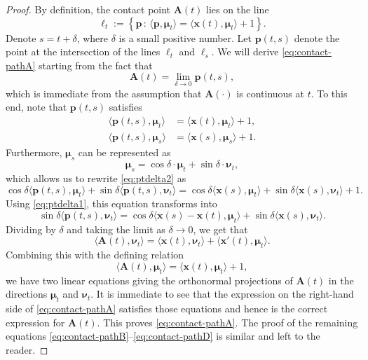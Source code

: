 \documentclass[11pt]{article}
\newcommand{\nvecone}{\boldsymbol{\mu}}
\newcommand{\nvectwo}{\boldsymbol{\nu}}
\begin{document}
\begin{proof} 
By definition, the contact point $\mathbf{A}(t)$ lies on the line
$$
\ell_t := \left\{ \mathbf{p}\,:\,
\Big\langle \mathbf{p}, \nvecone_t \Big\rangle = \Big\langle \mathbf{x}(t), \nvecone_t \Big\rangle +1
\right\}.
$$
Denote $s=t+\delta$, where $\delta$ is a small positive number.
Let $\mathbf{p}(t,s)$ denote the point at the intersection of the lines $\ell_t$ and $\ell_s$. We will derive \eqref{eq:contact-pathA} starting from the fact that
$$ \mathbf{A}(t) = \lim_{\delta\to 0} \mathbf{p}(t,s), $$
which is immediate from the assumption that $\mathbf{A}(\cdot)$ is continuous at $t$. To this end, note that $\mathbf{p}(t,s)$ satisfies
\begin{align}
\Big\langle \mathbf{p}(t,s), \nvecone_t \Big \rangle &= \Big\langle \mathbf{x}(t), \nvecone_t \Big \rangle+1, 
\label{eq:ptdelta1}
\\
\Big\langle \mathbf{p}(t,s), \nvecone_s \Big \rangle &= \Big\langle \mathbf{x}(s), \nvecone_s \Big \rangle+1.
\label{eq:ptdelta2}
\end{align}
Furthermore, $\nvecone_s$ can be represented as
$$
\nvecone_s = \cos \delta \cdot \nvecone_t + \sin \delta \cdot \nvectwo_t,
$$
which allows us to rewrite \eqref{eq:ptdelta2} as
$$
\cos \delta \Big\langle \mathbf{p}(t,s), \nvecone_t \Big \rangle 
+ \sin \delta \Big\langle \mathbf{p}(t,s), \nvectwo_t \Big \rangle
= 
\cos \delta \Big\langle \mathbf{x}(s), \nvecone_t \Big \rangle
+\sin \delta \Big\langle \mathbf{x}(s), \nvectwo_t \Big \rangle
+1.
$$
Using \eqref{eq:ptdelta1}, this equation transforms into
$$
\sin \delta \Big\langle \mathbf{p}(t,s), \nvectwo_t \Big \rangle 
= 
\cos \delta \Big\langle \mathbf{x}(s)-\mathbf{x}(t), \nvecone_t \Big \rangle
+\sin \delta \Big\langle \mathbf{x}(s), \nvectwo_t \Big \rangle.
$$
Dividing by $\delta$ and taking the limit as $\delta\to 0$, we get that
$$
\Big\langle \mathbf{A}(t), \nvectwo_t \Big\rangle = \Big\langle \mathbf{x}(t), \nvectwo_t \Big\rangle
+ \Big\langle \mathbf{x}'(t), \nvecone_t \Big\rangle.
$$
Combining this with the defining relation 
$$\Big\langle \mathbf{A}(t), \nvecone_t \Big\rangle = 
\Big\langle \mathbf{x}(t), \nvecone_t \Big\rangle + 1,
$$
we have two linear equations giving the orthonormal projections of $\mathbf{A}(t)$ in the directions $\nvecone_t$ and $\nvectwo_t$. It is immediate to see that the expression on the right-hand side of \eqref{eq:contact-pathA} satisfies those equations and hence is the correct expression for $\mathbf{A}(t)$. This proves \eqref{eq:contact-pathA}. The proof of the remaining equations \eqref{eq:contact-pathB}--\eqref{eq:contact-pathD} is similar and left to the reader.
\end{proof}
\end{document}
